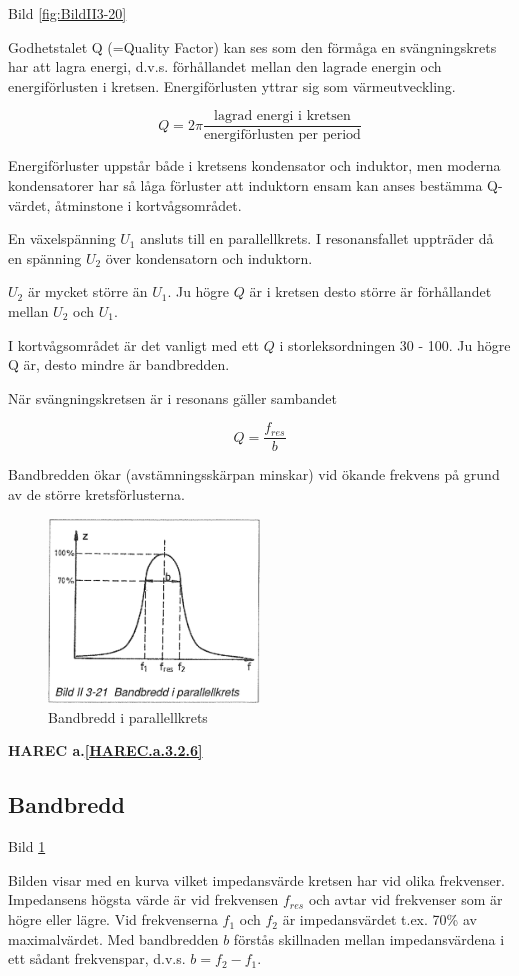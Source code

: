 Bild \ref{fig:BildII3-20}

Godhetstalet Q (=Quality Factor) kan ses som den förmåga en svängningskrets har
att lagra energi, d.v.s. förhållandet mellan den lagrade energin och
energiförlusten i kretsen. Energiförlusten yttrar sig som värmeutveckling.

\[
Q = 2π\frac{\text{lagrad energi i kretsen}}{\text{energiförlusten per period}}
\]

Energiförluster uppstår både i kretsens kondensator och induktor, men moderna
kondensatorer har så låga förluster att induktorn ensam kan anses bestämma
Q-värdet, åtminstone i kortvågsområdet.

En växelspänning \(U_1\) ansluts till en parallellkrets. I resonansfallet
uppträder då en spänning \(U_2\) över kondensatorn och induktorn.

\(U_2\) är mycket större än \(U_1\). Ju högre \(Q\) är i kretsen desto större är
förhållandet mellan \(U_2\) och \(U_1\).

I kortvågsområdet är det vanligt med ett \(Q\) i storleksordningen 30 - 100.
Ju högre Q är, desto mindre är bandbredden.

När svängningskretsen är i resonans gäller sambandet

\[Q = \frac{f_{res}}{b}\]

Bandbredden ökar (avstämningsskärpan minskar) vid ökande frekvens på grund av de
större kretsförlusterna.

\begin{figure}
\includegraphics[width=0.5\textwidth]{images/bild_2_3-21}
\caption{Bandbredd i parallellkrets}
\label{fig:BildII3-21}
\end{figure}

\textbf{HAREC a.\ref{HAREC.a.3.2.6}\label{myHAREC.a.3.2.6}}

\subsection{Bandbredd}

Bild \ref{fig:BildII3-21}

Bilden visar med en kurva vilket impedansvärde kretsen har vid olika frekvenser.
Impedansens högsta värde är vid frekvensen \(f_{res}\) och avtar vid frekvenser
som är högre eller lägre. Vid frekvenserna \(f_1\) och \(f_2\) är
impedansvärdet t.ex. 70\% av maximalvärdet. Med bandbredden \(b\) förstås
skillnaden mellan impedansvärdena i ett sådant frekvenspar, d.v.s.
\(b = f_2 - f_1\).
